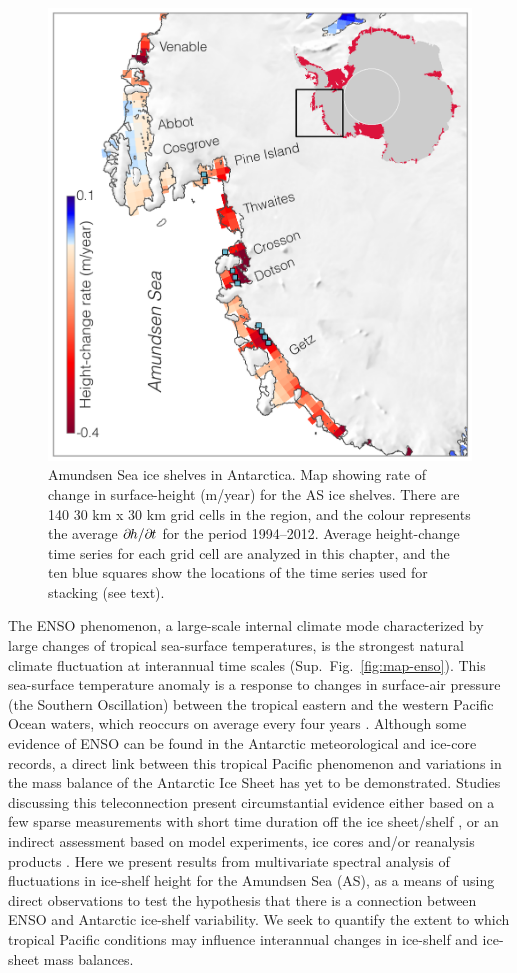 \begin{figure}[!hb]
  \centering
  \includegraphics[width=.72\textwidth]{img/map_amundsen_v3.png}
  \caption[Map of Amundsen Sea (AS) ice shelves]{
  Amundsen Sea ice shelves in Antarctica. Map showing rate of change in surface-height (m/year) for the AS ice shelves. There are 140 30 km x 30 km grid cells in the region, and the colour represents the average $\partial\mkern-1.5mu h/\partial\mkern-1.5mu t$ for the period 1994--2012. Average height-change time series for each grid cell are analyzed in this chapter, and the ten blue squares show the locations of the time series used for stacking (see text).
  }
  \label{fig:map-amundsen}
\end{figure}


The ENSO phenomenon, a large-scale internal climate mode characterized by large changes of tropical sea-surface temperatures, is the strongest natural climate fluctuation at interannual time scales (Sup.~Fig.~\ref{fig:map-enso}). This sea-surface temperature anomaly is a response to changes in surface-air pressure (the Southern Oscillation) between the tropical eastern and the western Pacific Ocean waters, which reoccurs on average every four years \parencite{Latif2009, Philander1989}. Although some evidence of ENSO can be found in the Antarctic meteorological and ice-core records, a direct link between this tropical Pacific phenomenon and variations in the mass balance of the Antarctic Ice Sheet has yet to be demonstrated. Studies discussing this teleconnection present circumstantial evidence either based on a few sparse measurements with short time duration off the ice sheet/shelf \parencite[e.g.,][]{Dutrieux2014}, or an indirect assessment based on model experiments, ice cores and/or reanalysis products \parencite[e.g.,][]{Steig2013}. Here we present results from multivariate spectral analysis of fluctuations in ice-shelf height for the Amundsen Sea (AS), as a means of using direct observations to test the hypothesis that there is a connection between ENSO and Antarctic ice-shelf variability. We seek to quantify the extent to which tropical Pacific conditions may influence interannual changes in ice-shelf and ice-sheet mass balances.

